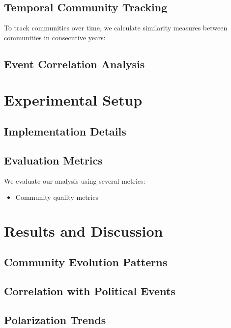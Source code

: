 \documentclass{article}
\begin{document}
\subsection{Temporal Community Tracking}
To track communities over time, we calculate similarity measures between communities in consecutive years:

\subsection{Event Correlation Analysis}

\section{Experimental Setup}
\subsection{Implementation Details}

\subsection{Evaluation Metrics}
We evaluate our analysis using several metrics:
\begin{itemize}
    \item Community quality metrics 
\end{itemize}

\section{Results and Discussion}
\subsection{Community Evolution Patterns}

\subsection{Correlation with Political Events}

\subsection{Polarization Trends}
\end{document}
